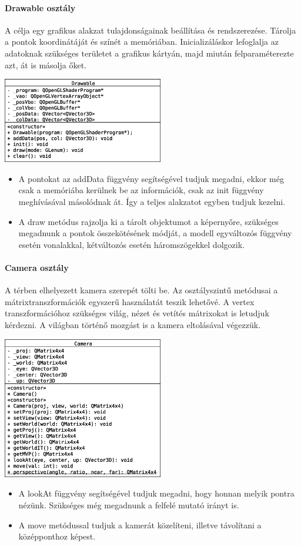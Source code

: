 \documentclass[12pt]{report}
\begin{document}
\paragraph{Drawable osztály}
A célja egy grafikus alakzat tulajdonságainak beállítása és rendszerezése. Tárolja a pontok koordinátáját és színét a memóriában. Inicializáláskor lefoglalja az adatoknak szükséges területet a grafikus kártyán, majd miután felparaméterezte azt, át is másolja őket.
\begin{center}
\includegraphics[width=7cm]{pics/uml/Drawable}
\end{center}
\begin{itemize}
\item A pontokat az addData függvény segítségével tudjuk megadni, ekkor még csak a memóriába kerülnek be az információk, csak az init függvény meghívásával másolódnak át. Így a teljes alakzatot egyben tudjuk kezelni.
\item A draw metódus rajzolja ki a tárolt objektumot a képernyőre, szükséges megadnunk a pontok összekötésének módját, a modell egyváltozós függvény esetén vonalakkal, kétváltozós esetén háromszögekkel dolgozik.
\end{itemize}

\paragraph{Camera osztály}
A térben elhelyezett kamera szerepét tölti be. Az osztályszintű metódusai a mátrixtranszformációk egyszerű használatát teszik lehetővé. A vertex transzformációhoz szükséges világ, nézet és vetítés mátrixokat is letudjuk kérdezni. A világban történő mozgást is a kamera eltolásával végezzük.
\begin{center}
\includegraphics[width=7cm]{pics/uml/Camera}
\end{center}
\begin{itemize}
\item A lookAt függvény segítségével tudjuk megadni, hogy honnan melyik pontra nézünk. Szükséges még megadnunk a felfelé mutató irányt is.
\item A move metódussal tudjuk a kamerát közelíteni, illetve távolítani a középponthoz képest.
\end{itemize}
\end{document}
